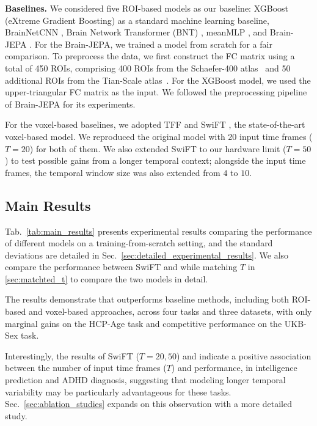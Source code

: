 \noindent \textbf{Baselines.}
We considered five ROI-based models as our baseline: XGBoost (eXtreme Gradient Boosting) \citep{xgboost} as a standard machine learning baseline, BrainNetCNN \citep{BNC}, Brain Network Transformer (BNT) \citep{BNT}, meanMLP \citep{meanmlp}, and Brain-JEPA \citep{brainjepa}.
For the Brain-JEPA, we trained a model from scratch for a fair comparison.
To preprocess the data, we first construct the FC matrix using a total of 450 ROIs, comprising 400 ROIs from the Schaefer-400 atlas~\citep{schaefer} and 50 additional ROIs from the Tian-Scale  atlas~\citep{tian}.
For the XGBoost model, we used the upper-triangular FC matrix as the input.
We followed the preprocessing pipeline of Brain-JEPA for its experiments.

For the voxel-based baselines, we adopted TFF \citep{TFF} and SwiFT \citep{swift}, the state-of-the-art voxel-based model. We reproduced the original model with 20 input time frames ($T=20$) for both of them. We also extended SwiFT to our hardware limit ($T=50$) to test possible gains from a longer temporal context; alongside the input time frames, the temporal window size was also extended from $4$ to $10$.




\subsection{Main Results}
\label{sec:main_results}
Tab.~\ref{tab:main_results} presents experimental results comparing the performance of different models on a training-from-scratch setting, and the standard deviations are detailed in Sec.~\ref{sec:detailed_experimental_results}. 
We also compare the performance between SwiFT and {\ours} while matching $T$ in \cref{sec:matchted_t} to compare the two models in detail.

The results demonstrate that {\ours} outperforms baseline methods, including both ROI-based and voxel-based approaches, across four tasks and three datasets, with only marginal gains on the HCP-Age task and competitive performance %
on the UKB-Sex task.

Interestingly, the results of SwiFT ($T=20,50$) and {\ours} indicate a positive association between the number of input time frames ($T$) and performance, in intelligence prediction and ADHD diagnosis, suggesting that modeling longer temporal variability may be particularly advantageous for these tasks. Sec.~\ref{sec:ablation_studies} expands on this observation with a more detailed study.

